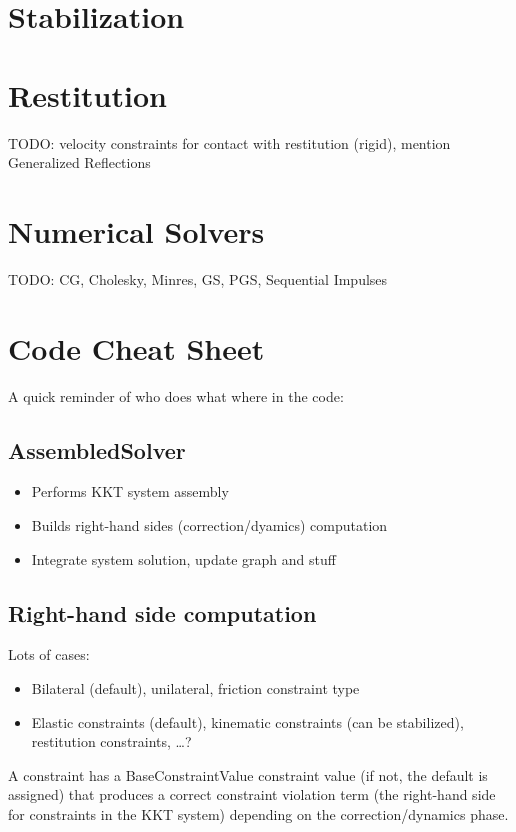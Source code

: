 \documentclass{article}
\begin{document}
\section{Stabilization}
%

\section{Restitution}
%
TODO: velocity constraints for contact with restitution (rigid),
mention Generalized Reflections
%
\section{Numerical Solvers}
\label{sec:solvers}
%
TODO: CG, Cholesky, Minres, GS, PGS, Sequential Impulses


\section{Code Cheat Sheet}

A quick reminder of who does what where in the code:

\subsection{AssembledSolver}

\begin{itemize}
\item Performs KKT system assembly
\item Builds right-hand sides (correction/dyamics) computation
\item Integrate system solution, update graph and stuff
\end{itemize}

\subsection{Right-hand side computation}

Lots of cases:
\begin{itemize}
\item Bilateral (default), unilateral, friction constraint type
\item Elastic constraints (default), kinematic constraints (can be stabilized), restitution constraints, \ldots ?
\end{itemize}

A constraint has a BaseConstraintValue constraint value (if not, the
default is assigned) that produces a correct constraint violation term
(the right-hand side for constraints in the KKT system) depending on
the correction/dynamics phase.
\end{document}
